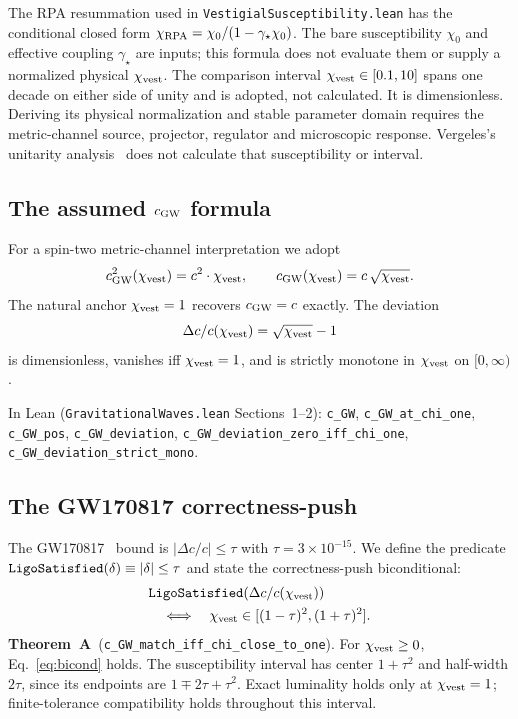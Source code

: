 \documentclass[aps,prd,twocolumn,showpacs,superscriptaddress,nofootinbib]{revtex4-2}
\newcommand{\cGW}{c_{\rm GW}}
\newcommand{\chivest}{\chi_{\rm vest}}
\newcommand{\dccap}{\Delta c/c}
\begin{document}
The RPA resummation used in
\texttt{VestigialSusceptibility.lean} has the conditional closed form
$\chi_{\rm RPA}=\chi_0/(1-\gamma_\star\chi_0)$.
The bare susceptibility $\chi_0$ and effective coupling
$\gamma_\star$ are inputs; this formula does not evaluate them or
supply a normalized physical $\chivest$.
The comparison interval $\chivest\in[0.1,10]$ spans one decade
on either side of unity and is adopted, not calculated.
It is dimensionless. Deriving its physical normalization and
stable parameter domain requires the metric-channel source,
projector, regulator and microscopic response.
Vergeles's unitarity analysis~\cite{Vergeles2025} does not
calculate that susceptibility or interval.

\subsection{The assumed $\cGW$ formula}

For a spin-two metric-channel interpretation we adopt
\begin{equation}
\cGW^{2}(\chivest) = c^{2}\cdot\chivest,
\qquad
\cGW(\chivest) = c\,\sqrt{\chivest}.
\label{eq:cGW}
\end{equation}
The natural anchor $\chivest = 1$ recovers $\cGW = c$ exactly.
The deviation
\begin{equation}
\dccap(\chivest) = \sqrt{\chivest} - 1
\label{eq:dccap}
\end{equation}
is dimensionless, vanishes iff $\chivest = 1$, and is strictly
monotone in $\chivest$ on $[0,\infty)$.

In Lean (\verb|GravitationalWaves.lean| Sections~1--2):
\verb|c_GW|, \verb|c_GW_at_chi_one|, \verb|c_GW_pos|,
\verb|c_GW_deviation|, \verb|c_GW_deviation_zero_iff_chi_one|,
\verb|c_GW_deviation_strict_mono|.

\subsection{The GW170817 correctness-push}

The GW170817~\cite{Abbott2017GW170817} bound is
$|\dccap| \leq \tau$ with $\tau = 3 \times 10^{-15}$.
We define the predicate
$\verb|LigoSatisfied|(\delta) \equiv |\delta| \leq \tau$ and
state the correctness-push biconditional:
\begin{equation}
\begin{aligned}
&\verb|LigoSatisfied|(\dccap(\chivest)) \\
&\quad\Longleftrightarrow\quad
\chivest \in [(1-\tau)^{2}, (1+\tau)^{2}].
\end{aligned}
\label{eq:bicond}
\end{equation}
\textbf{Theorem~A}~(\verb|c_GW_match_iff_chi_close_to_one|).
For $\chivest \geq 0$, Eq.~\eqref{eq:bicond} holds.
The susceptibility interval has center $1+\tau^2$ and half-width
$2\tau$, since its endpoints are $1\mp2\tau+\tau^2$.
Exact luminality holds only at $\chivest=1$; finite-tolerance
compatibility holds throughout this interval.
\end{document}
